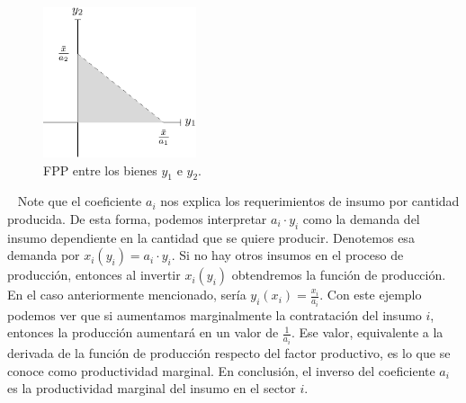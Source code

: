 \documentclass[
  letterpaper,
  DIV=11,
  numbers=noendperiod]{scrreport}
\begin{document}
\begin{figure}

{\centering \includegraphics[width=0.4\textwidth,height=\textheight]{intro_files/figure-pdf/fig-FPP-1.pdf}

}

\caption{\label{fig-FPP}FPP entre los bienes \(y_1\) e \(y_2\).}

\end{figure}

~ Note que el coeficiente \(a_i\) nos explica los requerimientos de
insumo por cantidad producida. De esta forma, podemos interpretar
\(a_i\cdot y_i\) como la demanda del insumo dependiente en la cantidad
que se quiere producir. Denotemos esa demanda por
\(x_i(y_i)=a_i\cdot y_i\). Si no hay otros insumos en el proceso de
producción, entonces al invertir \(x_i(y_i)\) obtendremos la función de
producción. En el caso anteriormente mencionado, sería
\(y_i(x_i)=\frac{x_i}{a_i}\). Con este ejemplo podemos ver que si
aumentamos marginalmente la contratación del insumo \(i\), entonces la
producción aumentará en un valor de \(\frac{1}{a_i}\). Ese valor,
equivalente a la derivada de la función de producción respecto del
factor productivo, es lo que se conoce como productividad marginal. En
conclusión, el inverso del coeficiente \(a_i\) es la productividad
marginal del insumo en el sector \(i\).
\end{document}
